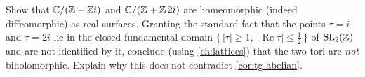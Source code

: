\begin{exercise}
\label{ex:tg-homeo-not-biholo}
Show that \(\mathbb{C}/(\mathbb{Z} + \mathbb{Z} i)\) and \(\mathbb{C}/(\mathbb{Z} + \mathbb{Z}\,2i)\) are homeomorphic (indeed
diffeomorphic) as real surfaces. Granting the standard fact that the points
\(\tau = i\) and \(\tau = 2i\) lie in the closed fundamental domain
\(\{\,|\tau| \ge 1,\ |\operatorname{Re}\tau| \le \tfrac12\,\}\) of
\(\mathrm{SL}_2(\mathbb{Z})\) and are not identified by it, conclude (using
\cref{ch:lattices}) that the two tori are \emph{not} biholomorphic. Explain why
this does not contradict \cref{cor:tg-abelian}.
\end{exercise}
